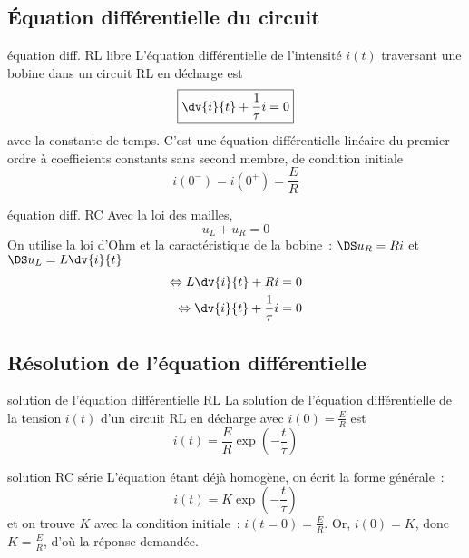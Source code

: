 \documentclass[../main/main.tex]{subfiles}
\begin{document}
\subsection{Équation différentielle du circuit}
\begin{tcbraster}[raster columns=2, raster equal height=rows]
    \begin{prop}[label=prop:eqdiffrldech]{équation diff. RL libre}
        L'équation différentielle de l'intensité $i(t)$ traversant une bobine
        dans un circuit RL en décharge est
        \[ \boxed{\dv{i}{t} + \frac{1}{\tau}i = 0}\]
        avec  la constante de temps.
        \tcblower
        C'est une équation différentielle linéaire du premier ordre à
        coefficients constants sans second membre, de condition initiale
        \[ \boxed{i(0^-) = i(0^+) = \frac{E}{R}}\]
    \end{prop}
    \begin{demo}[label=demo:eqdiffrc]{équation diff. RC}
        Avec la loi des mailles,
        $$u_L + u_R = 0$$
        On utilise la loi d'Ohm et la caractéristique de la bobine~:
        $\DS u_R = Ri$ et $\DS u_L = L \dv{i}{t}$
        \begin{align*}
            \Leftrightarrow L\dv{i}{t} + Ri             & = 0\\
            \Leftrightarrow \dv{i}{t} + \frac{1}{\tau}i & = 0
        \end{align*}
    \end{demo}
\end{tcbraster}

\subsection{Résolution de l'équation différentielle}
\begin{tcbraster}[raster columns=2, raster equal height=rows]
    \begin{prop}[label=prop:ulsoludech]{solution de l'équation
        différentielle RL}
        La solution de l'équation différentielle de la tension $i(t)$
        d'un circuit RL en décharge avec $i(0) = \frac{E}{R}$ est
        \[\boxed{i(t) = \frac{E}{R}\exp\left(-\frac{t}{\tau}\right)}\]
    \end{prop}
    \begin{demo}[label=demo:rcsolu]{solution RC série}
        L'équation étant déjà homogène, on écrit la forme générale~:
        \[i(t) = K\exp\left( -\frac{t}{\tau} \right)\]
        et on trouve $K$ avec la condition initiale~: $i(t=0) = \frac{E}{R}$.
        Or, $i(0) = K$, donc $K= \frac{E}{R}$, d'où la réponse demandée.
    \end{demo}
\end{tcbraster}
\end{document}

